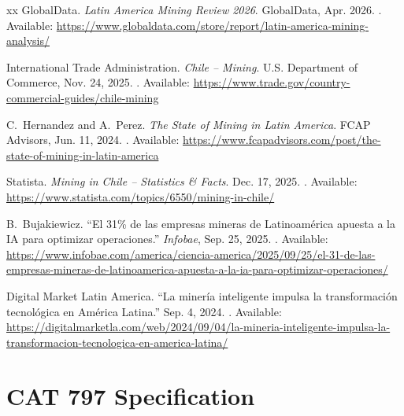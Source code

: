\documentclass[letterpaper]{ifacconf}
\begin{document}
\begin{thebibliography}{xx}
GlobalData.
\newblock \emph{Latin America Mining Review 2026}.
\newblock GlobalData, Apr. 2026.
\newblock [Online]. Available: \url{https://www.globaldata.com/store/report/latin-america-mining-analysis/}

International Trade Administration.
\newblock \emph{Chile -- Mining}.
\newblock U.S. Department of Commerce, Nov. 24, 2025.
\newblock [Online]. Available: \url{https://www.trade.gov/country-commercial-guides/chile-mining}

C.~Hernandez and A.~Perez.
\newblock \emph{The State of Mining in Latin America}.
\newblock FCAP Advisors, Jun. 11, 2024.
\newblock [Online]. Available: \url{https://www.fcapadvisors.com/post/the-state-of-mining-in-latin-america}

Statista.
\newblock \emph{Mining in Chile -- Statistics \& Facts}.
\newblock Dec. 17, 2025.
\newblock [Online]. Available: \url{https://www.statista.com/topics/6550/mining-in-chile/}

B.~Bujakiewicz.
\newblock ``El 31\% de las empresas mineras de Latinoam\'erica apuesta a la IA para optimizar operaciones.''
\newblock \emph{Infobae}, Sep. 25, 2025.
\newblock [Online]. Available: \url{https://www.infobae.com/america/ciencia-america/2025/09/25/el-31-de-las-empresas-mineras-de-latinoamerica-apuesta-a-la-ia-para-optimizar-operaciones/}

Digital Market Latin America.
\newblock ``La miner\'ia inteligente impulsa la transformaci\'on tecnol\'ogica en Am\'erica Latina.''
\newblock Sep. 4, 2024.
\newblock [Online]. Available: \url{https://digitalmarketla.com/web/2024/09/04/la-mineria-inteligente-impulsa-la-transformacion-tecnologica-en-america-latina/}

\end{thebibliography}


\appendix
\section{CAT 797 Specification}
\end{document}
